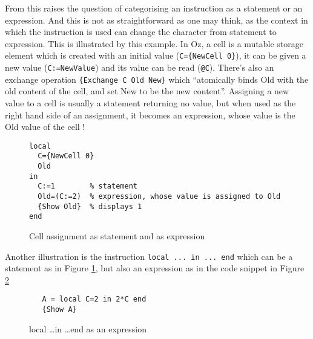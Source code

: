 \documentclass[a4paper]{memoir}
\begin{document}
From this raises the question of categorising an instruction as a statement or an expression. And this is not as straightforward as one may think, as the context in which the instruction is used can change the character from statement to expression. This is illustrated by this example.
In Oz, a cell is a mutable storage element which is created with an initial value (\lstinline!C={NewCell 0}!), it can be given a new value (\lstinline!C:=NewValue!) and its value can be read (\lstinline!@C!). There's also an exchange operation \lstinline!{Exchange C Old New}! which ``atomically binds Old with the old content of the cell, and set New to be the new content''.%
Assigning a new value to a cell is usually a statement returning no value, but when used as the right hand side of an assignment, it becomes an expression, whose value is the Old value of the cell !
\begin{figure}[h]
\begin{lstlisting}
local
  C={NewCell 0}
  Old
in
  C:=1        % statement
  Old=(C:=2)  % expression, whose value is assigned to Old
  {Show Old}  % displays 1
end

\end{lstlisting}
\caption{Cell assignment as statement and as expression}
\label{fig:statement_and_expression1}
\end{figure}
Another illustration is the instruction \lstinline!local ... in ... end! which can be a statement as in Figure \ref{fig:statement_and_expression1}, but also an expression as in the code snippet in Figure \ref{fig:statement_and_expression2}

\begin{figure}[h]
\begin{lstlisting}
   A = local C=2 in 2*C end
   {Show A}
\end{lstlisting}
\caption{local \ldots in \ldots end as an expression}
\label{fig:statement_and_expression2}
\end{figure}
\end{document}
